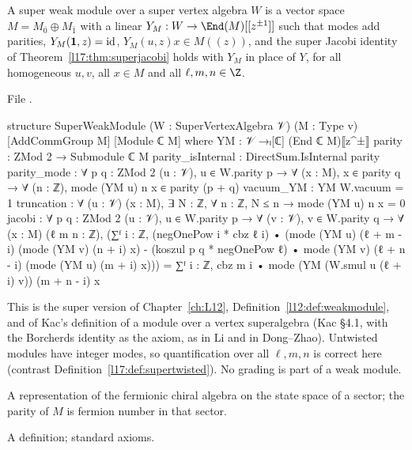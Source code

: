 \begin{definition}\label{l17:def:superweak}
A super weak module over a super vertex algebra $W$ is a vector space $M=M_{\bar0}\oplus M_{\bar1}$
with a linear $Y_M:W\to\End(M)[[z^{\pm1}]]$ such that modes add parities, $Y_M(\mathbf{1},z)=\mathrm{id}$,
$Y_M(u,z)x\in M((z))$, and the super Jacobi identity of Theorem~\ref{l17:thm:superjacobi} holds with
$Y_M$ in place of $Y$, for all homogeneous $u,v$, all $x\in M$ and all $\ell,m,n\in\Z$.
\end{definition}
\noindent File .
\begin{leancode}
structure SuperWeakModule (W : SuperVertexAlgebra 𝒱) (M : Type v)
    [AddCommGroup M] [Module ℂ M] where
  YM : 𝒱 →ₗ[ℂ] (End ℂ M)⟦z^±⟧
  parity : ZMod 2 → Submodule ℂ M
  parity_isInternal : DirectSum.IsInternal parity
  parity_mode : ∀ {p q : ZMod 2} (u : 𝒱), u ∈ W.parity p → ∀ (x : M), x ∈ parity q →
    ∀ (n : ℤ), mode (YM u) n x ∈ parity (p + q)
  vacuum_YM : YM W.vacuum = 1
  truncation : ∀ (u : 𝒱) (x : M), ∃ N : ℤ, ∀ n : ℤ, N ≤ n → mode (YM u) n x = 0
  jacobi : ∀ {p q : ZMod 2} (u : 𝒱), u ∈ W.parity p → ∀ (v : 𝒱), v ∈ W.parity q →
    ∀ (x : M) (ℓ m n : ℤ),
    (∑ᶠ i : ℤ, (negOnePow i * cbz ℓ i) •
        (mode (YM u) (ℓ + m - i) (mode (YM v) (n + i) x)
          - (koszul p q * negOnePow ℓ) • mode (YM v) (ℓ + n - i) (mode (YM u) (m + i) x)))
      = ∑ᶠ i : ℤ, cbz m i • mode (YM (W.smul u (ℓ + i) v)) (m + n - i) x
\end{leancode}
\begin{dictionary}
This is the super version of Chapter~\ref{ch:L12}, Definition~\ref{l12:def:weakmodule}, and of Kac's
definition of a module over a vertex superalgebra (Kac §4.1, with the Borcherds identity as the
axiom, as in Li and in Dong--Zhao). Untwisted modules have integer modes, so quantification over all
$\ell,m,n$ is correct here (contrast Definition~\ref{l17:def:supertwisted}). No grading is part of a
weak module.
\end{dictionary}
\begin{physics}
A representation of the fermionic chiral algebra on the state space of a sector; the parity of
$M$ is fermion number in that sector.
\end{physics}
\begin{status}
A definition; standard axioms.
\end{status}


